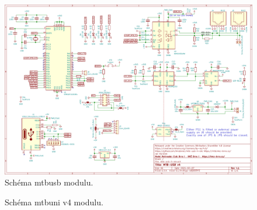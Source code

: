 \vspace{-2em}

\begin{figure}[H]
\includegraphics[angle=90,width=\textwidth]{data/mtb-usb-4-ele.pdf}
\caption{Schéma \gls{mtbusb} modulu.}
\label{fig:mtb-usb-sch}
\end{figure}

\begin{figure}[ht]
\caption{Schéma \gls{mtbuni} v4 modulu.}
\label{fig:mtb-uni-4-sch}
\end{figure}
